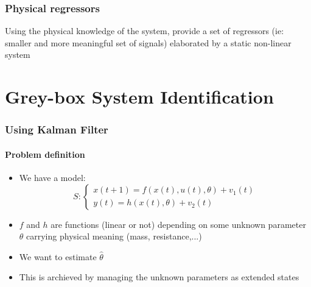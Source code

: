 \documentclass{article}
\let\OldPart\part
\renewcommand{\part}{\newpage\OldPart}
\begin{document}
\section{Physical regressors}
Using the physical knowledge of the system, provide a set of regressors (ie: smaller and more meaningful set of signals) elaborated by a static non-linear system
\begin{center}
\end{center}

\part{Grey-box System Identification}
\section{Using Kalman Filter}
\subsection{Problem definition}
\begin{itemize}
\item We have a model:
\[
S:
\begin{cases}
x(t+1)=f(x(t),u(t),\theta)+v_1(t)\\
y(t)=h(x(t),\theta)+v_2(t)
\end{cases}
\]
\item $f$ and $h$ are functions (linear or not) depending on some unknown parameter $\theta$ carrying physical meaning (mass, resistance,...)
\item We want to estimate $\hat{\theta}$
\item This is archieved by managing the unknown parameters as extended states
\end{itemize}
\end{document}
